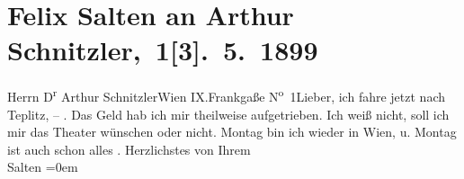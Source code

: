

         
         \renewcommand{\erwaehntePersonen}{Personen: Felix Salten}
         \renewcommand{\erwaehnteInstitutionen}{Institutionen: Stadttheater Teplitz}
         \renewcommand{\erwaehnteOrte}{Orte: Frankgasse 1, IX., Alsergrund, Teplice, Wien}
         \renewcommand{\erwaehnteWerke}{}
               \section[ Felix Salten an Arthur Schnitzler, 1{[}3{]}. 5. 1899]{ Felix Salten an Arthur Schnitzler, 1{[}3{]}. 5. 1899}\nopagebreak{}\rehead{ }\begin{ledgroupsized}[t]{13cm}\normalsize\beginnumbering \toendnotes[C]{\smallbreak\pagebreak[2]} 
\toendnotes[C]{\smallbreak}\pstart{}{\pb}Herrn D\textsuperscript{r} Arthur Schnitzler\pend{}\pstart{}Wien IX.\pend{}\pstart{}Frankgaße N\textsuperscript{o} 1\pend{}{\bigskip}\pstart{}{\pb}Lieber,\pend\pstart
           ich fahre jetzt nach Teplitz, – \label{K_L03292-1v}\label{K_L03292-1h}. Das Geld hab ich mir theilweise aufgetrieben. Ich weiß nicht, soll ich mir
                   das Theater wünschen oder nicht.\pend
           \pstart
           Montag bin ich wieder in Wien, u. Montag ist auch schon alles \label{K_L03292-55v}\label{K_L03292-55h}.\pend
           \pstart
           Herzlichstes von Ihrem {\\[\baselineskip]}\spacefill\mbox{Salten}\pend
           \leftskip=0em{}
         
         \endnumbering{}\end{ledgroupsized}  \newcommand{\dateiname}{L03292}\newcommand{\titel}{Felix Salten an Arthur Schnitzler, 1[3]. 5. 1899}\newcommand{\editorInnen}{Martin Anton Müller und Laura Untner}
      